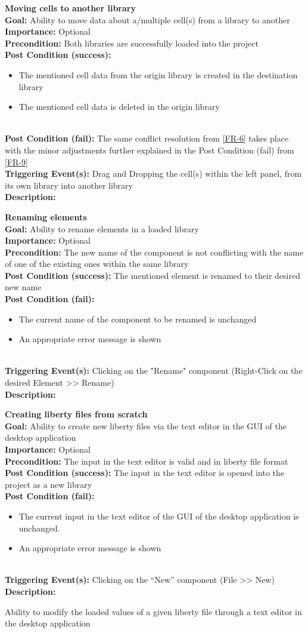 \documentclass[10pt,a4paper]{report}
\newcommand{\FRDescription}[8]{
    \textbf{#1} \leavevmode \\
    \textbf{Goal: } #2 \leavevmode \\
    \textbf{Importance: } #3 \leavevmode \\
    \textbf{Precondition: } #4 \leavevmode \\
    \textbf{Post Condition (success): } #5 \leavevmode \\
    \textbf{Post Condition (fail): } #6 \leavevmode \\
    \textbf{Triggering Event(s): } #7 \leavevmode \\
    \textbf{Description: } \leavevmode \\ 
    #8}
\newcommand{\FRODescription}[8]{
    \textbf{#1} \leavevmode \\
    \textbf{Goal: } #2 \leavevmode \\
    \textbf{Importance: } #3 \leavevmode \\
    \textbf{Precondition: } #4 \leavevmode \\
    \textbf{Post Condition (success): } #5 \leavevmode \\
    \textbf{Post Condition (fail): } #6 \leavevmode \\
    \textbf{Triggering Event(s): } #7 \leavevmode \\
    \textbf{Description: } \leavevmode \\
    #8}
\begin{document}
\begin{FRO}
    \item \FRDescription{Moving cells to another library}
    {Ability to move data about a/multiple cell(s) from a library to another}
    {Optional}
    {Both libraries are successfully loaded into the project}
    {\begin{itemize}
        \item The mentioned cell data from the origin library is created in the destination library
        \item The mentioned cell data is deleted in the origin library
    \end{itemize}}
    {The same conflict resolution from \ref{FR-6} takes place with the minor adjustments further explained in the Post Condition (fail) from \ref{FR-9}}
    {Drag and Dropping the cell(s) within the left panel, from its own library into another library}
    \item \FRODescription{Renaming elements}
    {Ability to rename elements in a loaded library}
    {Optional}
    {The new name of the component is not conflicting with the name of one of the existing ones within the same library}
    {The mentioned element is renamed to their desired new name}
    {\begin{itemize}
        \item The current name of the component to be renamed is unchanged
        \item An appropriate error message is shown
    \end{itemize}}
    {Clicking on the "Rename" component (Right-Click on the desired Element  >> Rename)}
    \item \FRODescription{Creating liberty files from scratch}
    {Ability to create new liberty files via the text editor in the GUI of the desktop application}
    {Optional}
    {The input in the text editor is valid and in liberty file format}
    {The input in the text editor is opened into the project as a new library}
    {\begin{itemize}
        \item The current input in the text editor of the GUI of the desktop application is unchanged.
        \item An appropriate error message is shown
    \end{itemize}}
    {Clicking on the “New” component (File >> New)}
    \item {}
    {Ability to modify the loaded values of a given liberty file through a text editor in the desktop application}

\end{FRO}
\end{document}

